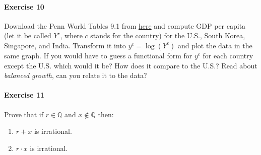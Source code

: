 \documentclass[a4paper,11pt]{article}
\theoremstyle{definition}
\theoremstyle{plain}
\begin{document}
\paragraph{Exercise 10}\label{exercise-10}

Download the Penn World Tables 9.1 from \href{https://www.rug.nl/ggdc/productivity/pwt/}{here} and compute GDP per capita (let it be called $Y^c$, where $c$ stands for the country) for the U.S., South Korea, Singapore, and India. Transform it into $y^c = \log(Y^c)$ and plot the data in the same graph. If you would have to guess a functional form for $y^c$ for each country except the U.S. which would it be? How does it compare to the U.S.? Read about \textit{balanced growth}, can you relate it to the data?

\paragraph{Exercise 11}\label{exercise-11}

Prove that if $r\in\mathbb{Q}$ and $x\notin\mathbb{Q}$ then:
\begin{enumerate}
  \item $r + x$ is irrational.
  \item $r\cdot x$ is irrational.
\end{enumerate}
\end{document}
